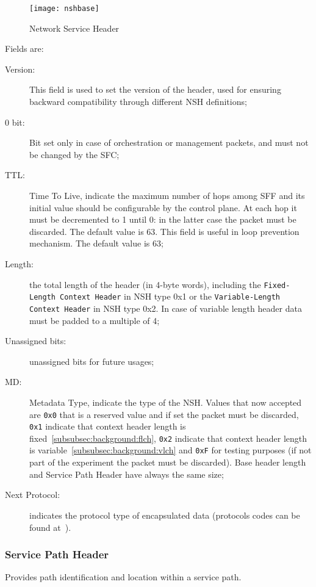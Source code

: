 \begin{figure}[H]
  \centering
  \texttt{[image: nshbase]}
  \caption{Network Service Header~\cite{rfc8300}}
  \label{chap:background:img:nshformat}
\end{figure}

Fields are:
\begin{description}
  \item[Version:] This field is used to set the version of the header, used for
  ensuring backward compatibility through different NSH definitions;
  \item[0 bit:] Bit set only in case of orchestration or management packets, and
  must not be changed by the SFC;
  \item[TTL:] Time To Live, indicate the maximum number of hops among SFF and
  its initial value should be configurable by the control plane. At each hop it
  must be decremented to 1 until 0: in the latter case the packet must be
  discarded. The default value is 63. This field is useful in loop prevention
  mechanism. The default value is 63;
  \item[Length:] the total length of the header (in 4-byte words), including
  the \texttt{Fixed-Length Context Header} in NSH type 0x1 or the
  \texttt{Variable-Length Context Header} in NSH type 0x2. In case of variable
  length header data must be padded to a multiple of 4;
  \item[Unassigned bits:] unassigned bits for future usages;
  \item[MD:] Metadata Type, indicate the type of the NSH. Values that now
  accepted are \texttt{0x0} that is a reserved value and if set the packet must
  be discarded, \texttt{0x1} indicate that context header length is
  fixed~\ref{subsubsec:background:flch}, \texttt{0x2} indicate that context
  header length is variable~\ref{subsubsec:background:vlch} and \texttt{0xF} for
  testing purposes (if not part of the experiment the packet must be discarded).
  Base header length and Service Path Header have always the same size;
  \item[Next Protocol:] indicates the protocol type of encapsulated data
  (protocols codes can be found at~\cite{rfc8300}).
\end{description}

\subsubsection{Service Path Header}
Provides path identification and location within a service path.

